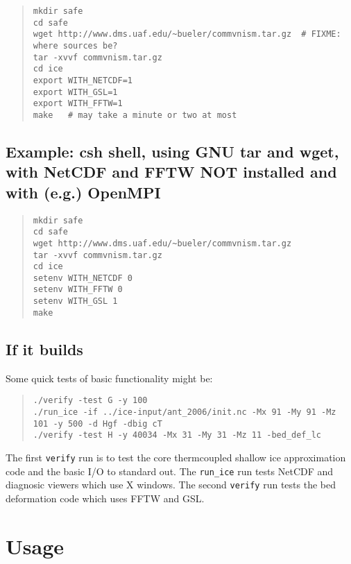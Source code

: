 \documentclass[final]{amsart}
\renewcommand{\t}[1]{\texttt{#1}}
\begin{document}
\begin{quote}\begin{verbatim}
mkdir safe
cd safe
wget http://www.dms.uaf.edu/~bueler/commvnism.tar.gz  # FIXME: where sources be?
tar -xvvf commvnism.tar.gz
cd ice
export WITH_NETCDF=1
export WITH_GSL=1
export WITH_FFTW=1
make   # may take a minute or two at most
\end{verbatim}
\end{quote}

\subsection{Example: csh shell, using GNU tar and wget, with NetCDF and FFTW NOT installed and with (e.g.) OpenMPI}

\begin{quote}\begin{verbatim}
mkdir safe
cd safe
wget http://www.dms.uaf.edu/~bueler/commvnism.tar.gz
tar -xvvf commvnism.tar.gz
cd ice
setenv WITH_NETCDF 0
setenv WITH_FFTW 0
setenv WITH_GSL 1
make
\end{verbatim}
\end{quote}

\subsection{If it builds} Some quick tests of basic functionality might be:
\begin{quote}\begin{verbatim}
./verify -test G -y 100 
./run_ice -if ../ice-input/ant_2006/init.nc -Mx 91 -My 91 -Mz 101 -y 500 -d Hgf -dbig cT
./verify -test H -y 40034 -Mx 31 -My 31 -Mz 11 -bed_def_lc
\end{verbatim}
\end{quote}
The first \t{verify} run is to test the core thermcoupled shallow ice approximation code and the basic I/O to standard out.  The \verb|run_ice| run tests NetCDF and diagnosic viewers which use X windows.  The second \t{verify} run tests the bed deformation code which uses FFTW and GSL.


\section{Usage}

\newcommand{\opt}[1]{\vspace{1mm}\noindent \large\texttt{-#1}\,:\quad\normalsize}
\newcommand{\optdef}[2]{\vspace{1mm}\noindent \large\texttt{-#1}\,[\textsl{#2}]:\quad\normalsize}
\newcommand{\und}{$\underline{\,\,\,}$}
\end{document}
